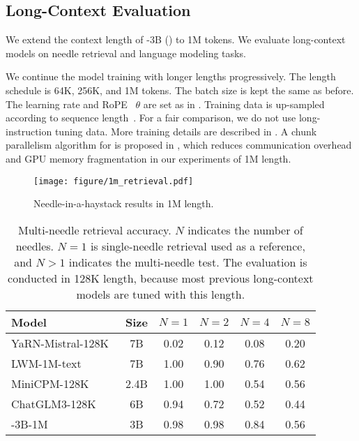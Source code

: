 \subsection{Long-Context Evaluation}
\label{sec:long:eval}

We extend the context length of \our{}-3B () to 1M tokens.
We evaluate long-context models on needle retrieval and language modeling tasks.

We continue the model training with longer lengths progressively.
The length schedule is 64K, 256K, and 1M tokens.
The batch size is kept the same as before.
The learning rate and RoPE~\cite{rotary} $\theta$ are set as in .
Training data is up-sampled according to sequence length~\cite{length:upsampling}.
For a fair comparison, we do not use long-instruction tuning data. 
More training details are described in .
A chunk parallelism algorithm for \our{} is proposed in , which reduces communication overhead and GPU memory fragmentation in our experiments of 1M length.

\begin{figure*}[t]
\centering
\captionsetup{type=figure}
\texttt{[image: figure/1m\_retrieval.pdf]}
\caption{Needle-in-a-haystack results in 1M length.
}
\label{fig:needle}
\end{figure*}

\begin{table*}[t]
\centering
\begin{tabular}{lccccc}
\toprule
\bf Model & \bf Size & $N=1$ & $N=2$ & $N=4$ & $N=8$ \\
\midrule
YaRN-Mistral-128K~\cite{yarn} & 7B & 0.02 & 0.12 & 0.08 & 0.20 \\
LWM-1M-text~\cite{lwm} & 7B & 1.00 & 0.90 & 0.76 & 0.62 \\
MiniCPM-128K~\cite{minicpm} & 2.4B & 1.00 & 1.00 & 0.54 & 0.56 \\
ChatGLM3-128K~\cite{glm} & 6B  & 0.94 & 0.72 & 0.52 & 0.44 \\
\our{}-3B-1M & 3B & 0.98 & 0.98 & 0.84 & 0.56 \\
\bottomrule
\end{tabular}
\caption{Multi-needle retrieval accuracy. $N$ indicates the number of needles. $N=1$ is single-needle retrieval used as a reference, and $N>1$ indicates the multi-needle test.
The evaluation is conducted in 128K length, because most previous long-context models are tuned with this length.
}
\label{tbl:multineedle}
\end{table*}

